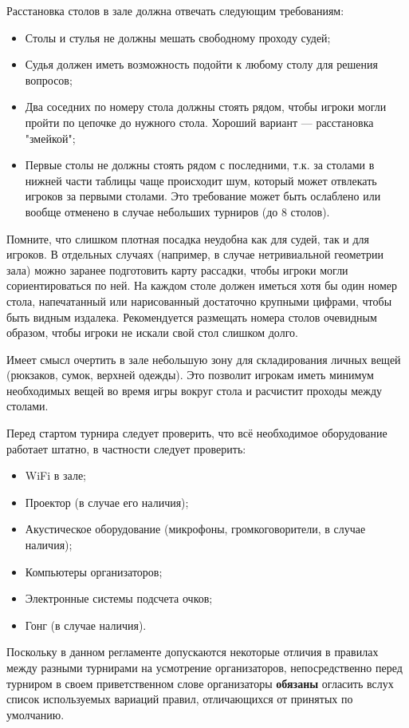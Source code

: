 Расстановка столов в зале должна отвечать следующим требованиям:
\begin{itemize}
	\item Столы и стулья не должны мешать свободному проходу судей;
	\item Судья должен иметь возможность подойти к любому столу для решения вопросов;
	\item Два соседних по номеру стола должны стоять рядом, чтобы игроки могли пройти по цепочке до нужного стола. Хороший вариант --- расстановка "змейкой";
	\item Первые столы не должны стоять рядом с последними, т.к. за столами в нижней части таблицы чаще происходит шум, который может отвлекать игроков за первыми столами. Это требование может быть ослаблено или вообще отменено в случае небольших турниров (до 8 столов).
\end{itemize}
Помните, что слишком плотная посадка неудобна как для судей, так и для игроков. В отдельных случаях (например, в случае нетривиальной геометрии зала) можно заранее подготовить карту рассадки, чтобы игроки могли сориентироваться по ней. На каждом столе должен иметься хотя бы один номер стола, напечатанный или нарисованный достаточно крупными цифрами, чтобы быть видным издалека. Рекомендуется размещать номера столов очевидным образом, чтобы игроки не искали свой стол слишком долго.

Имеет смысл очертить в зале небольшую зону для складирования личных вещей (рюкзаков, сумок, верхней одежды). Это позволит игрокам иметь минимум необходимых вещей во время игры вокруг стола и расчистит проходы между столами.

Перед стартом турнира следует проверить, что всё необходимое оборудование работает штатно, в частности следует проверить:
\begin{itemize}
	\item WiFi в зале;
	\item Проектор (в случае его наличия);
	\item Акустическое оборудование (микрофоны, громкоговорители, в случае наличия);
	\item Компьютеры организаторов;
	\item Электронные системы подсчета очков;
	\item Гонг (в случае наличия).
\end{itemize}

Поскольку в данном регламенте допускаются некоторые отличия в правилах между разными турнирами на усмотрение организаторов, непосредственно перед турниром в своем приветственном слове организаторы \textbf{обязаны} огласить вслух список используемых вариаций правил, отличающихся от принятых по умолчанию.

